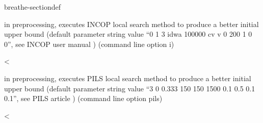 \documentclass[letterpaper,10pt,openany,oneside,english]{sphinxmanual}
\begin{document}
\begin{fulllineitems}
\begin{sphinxuseclass}{breathe-sectiondef}
\begin{fulllineitems}
\sphinxAtStartPar
in preprocessing, executes INCOP local search method to produce a better initial upper bound (default parameter string value “0 1 3 idwa 100000 cv v 0 200 1 0 0”, see INCOP user manual ) (command line option \sphinxhyphen{}i) 

\end{fulllineitems}


\begin{fulllineitems}
\label{\detokenize{ref/ref_cpp:_CPPv4N8ToulBar212searchMethodE}}\label{\detokenize{ref/ref_cpp:_CPPv3N8ToulBar212searchMethodE}}\label{\detokenize{ref/ref_cpp:_CPPv2N8ToulBar212searchMethodE}}\label{\detokenize{ref/ref_cpp:ToulBar2::searchMethod__SearchMethod}}
\pysigstartsignatures
\pysigstartmultiline
{}
\pysigstopmultiline
\pysigstopsignatures
\sphinxAtStartPar
\textless{} 

\sphinxAtStartPar
in preprocessing, executes PILS local search method to produce a better initial upper bound (default parameter string value “3 0 0.333 150 150 1500 0.1 0.5 0.1 0.1”, see PILS article ) (command line option \sphinxhyphen{}pils) 

\end{fulllineitems}


\begin{fulllineitems}
\label{\detokenize{ref/ref_cpp:_CPPv4N8ToulBar211clusterFileE}}\label{\detokenize{ref/ref_cpp:_CPPv3N8ToulBar211clusterFileE}}\label{\detokenize{ref/ref_cpp:_CPPv2N8ToulBar211clusterFileE}}\label{\detokenize{ref/ref_cpp:ToulBar2::clusterFile__string}}
\pysigstartsignatures
\pysigstartmultiline
{}
\pysigstopmultiline
\pysigstopsignatures
\sphinxAtStartPar
\textless{} 


\end{fulllineitems}
\end{sphinxuseclass}
\end{fulllineitems}
\end{document}

